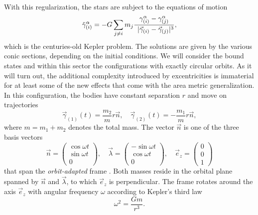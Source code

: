With this regularization, the stars are subject to the equations of motion
\begin{equation}
  \ddot\gamma^\alpha_{(i)} = -G \sum_{j\neq i} m_j \frac{\gamma^\alpha_{(i)} - \gamma^\alpha_{(j)}}{\prescript{\hphantom{3}}{}\lvert\vec\gamma_{(i)} - \vec\gamma_{(j)}\rvert^3},
\end{equation}
which is the centuries-old Kepler problem. The solutions are given by the various conic sections, depending on the initial conditions. We will consider the bound states and within this sector the configurations with exactly circular orbits. As it will turn out, the additional complexity introduced by excentricities is immaterial for at least some of the new effects that come with the area metric generalization. In this configuration, the bodies have constant separation $r$ and move on trajectories
\begin{equation}\label{circular_orbit}
  \vec\gamma_{(1)}(t) = \frac{m_2}{m} r\vec n,\quad \vec\gamma_{(2)}(t) = -\frac{m_1}{m} r\vec n,
\end{equation}
where $m = m_1 + m_2$ denotes the total mass. The vector $\vec n$ is one of the three basis vectors
\begin{equation}
  \vec n = \begin{pmatrix} \operatorname{cos}\omega t \\ \operatorname{sin}\omega t \\ 0 \end{pmatrix},\quad \vec \lambda = \begin{pmatrix} -\operatorname{sin}\omega t \\ \operatorname{cos}\omega t \\ 0 \end{pmatrix},\quad \vec e_z = \begin{pmatrix}0 \\ 0 \\ 1\end{pmatrix}
\end{equation}
that span the \emph{orbit-adapted} frame \cite{poisson2014gravity}. Both masses reside in the orbital plane spanned by $\vec n$ and $\vec\lambda$, to which $\vec e_z$ is perpendicular. The frame rotates around the axis $\vec e_z$ with angular frequency $\omega$ according to Kepler's third law
\begin{equation}
  \omega^2 = \frac{Gm}{r^3}.
\end{equation}

